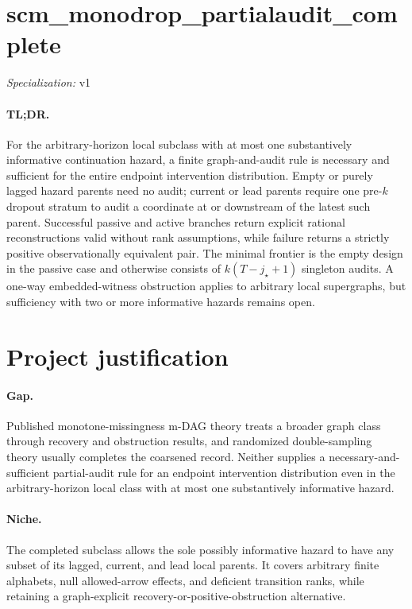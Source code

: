 \documentclass{article}
\begin{document}
\sloppy

\section*{scm\_\allowbreak{}monodrop\_\allowbreak{}partialaudit\_\allowbreak{}complete}

\noindent\textit{Specialization:} v1\par

\paragraph{TL;DR.} For the arbitrary-horizon local subclass with at most one substantively informative continuation hazard, a finite graph-and-audit rule is necessary and sufficient for the entire endpoint intervention distribution. Empty or purely lagged hazard parents need no audit; current or lead parents require one pre-\(k\) dropout stratum to audit a coordinate at or downstream of the latest such parent. Successful passive and active branches return explicit rational reconstructions valid without rank assumptions, while failure returns a strictly positive observationally equivalent pair. The minimal frontier is the empty design in the passive case and otherwise consists of \(k(T-j_\star+1)\) singleton audits. A one-way embedded-witness obstruction applies to arbitrary local supergraphs, but sufficiency with two or more informative hazards remains open.

\section{Project justification}

\paragraph{Gap.} Published monotone-missingness m-DAG theory treats a broader graph class through recovery and obstruction results, and randomized double-sampling theory usually completes the coarsened record. Neither supplies a necessary-and-sufficient partial-audit rule for an endpoint intervention distribution even in the arbitrary-horizon local class with at most one substantively informative hazard.

\paragraph{Niche.} The completed subclass allows the sole possibly informative hazard to have any subset of its lagged, current, and lead local parents. It covers arbitrary finite alphabets, null allowed-arrow effects, and deficient transition ranks, while retaining a graph-explicit recovery-or-positive-obstruction alternative.
\end{document}
